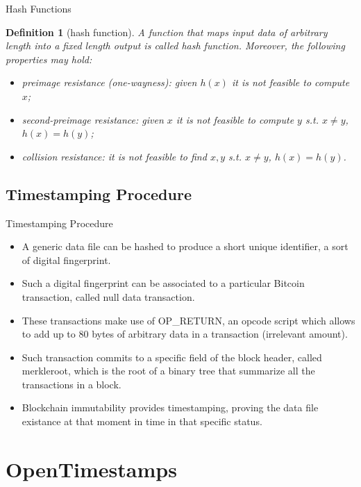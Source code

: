 \documentclass[usenames,dvipsnames]{beamer}
\newtheorem{mydef}{\alert{Definition}}[section]
\begin{document}
    \begin{frame}{Hash Functions}
       \begin{mydef}[hash function]
	A function that maps input data of arbitrary length into a fixed length output is called hash function. Moreover, the following properties may hold:
	\begin{itemize}
		\item preimage resistance (one-wayness): given $h(x)$ it is not feasible to compute $x$;
		\item second-preimage resistance: given $x$ it is not feasible to compute $y$ s.t. $x \neq y$, $h(x)=h(y)$;
		\item collision resistance: it is not feasible to find $x, y$ s.t. $x \neq y$, $h(x)=h(y)$.
	\end{itemize}
\end{mydef}
    \end{frame}
    
    \subsection{Timestamping Procedure}
    \begin{frame}{Timestamping Procedure}
        \begin{itemize}
            \item A generic data file can be \alert{hashed} to produce a short unique identifier, a sort of \alert{digital fingerprint}.
            \item Such a \alert{digital fingerprint} can be associated to a particular Bitcoin transaction, called \alert{null data transaction}.
            \item These transactions make use of \alert{OP\_RETURN}, an opcode script which allows to add up to 80 bytes of arbitrary data in a transaction (irrelevant amount).
            \item Such transaction \alert{commits} to a specific field of the block header, called \alert{merkleroot}, which is the root of a binary tree that summarize all the transactions in a block.
            \item Blockchain \alert{immutability} provides \alert{timestamping}, proving the data file existance at that moment in time in that specific status.
        \end{itemize}    
    \end{frame}
    
    \section{OpenTimestamps}
\end{document}
